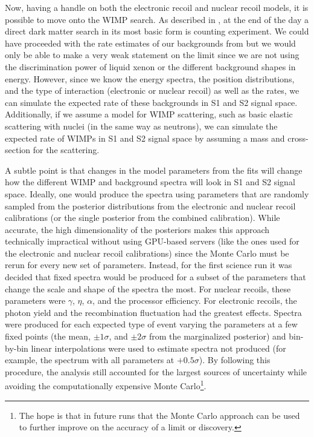 Now, having a handle on both the electronic recoil and nuclear recoil models, it is possible to move onto the WIMP search.  As described in , at the end of the day a direct dark matter search in its most basic form is counting experiment.  We could have proceeded with the rate estimates of our backgrounds from  but we would only be able to make a very weak statement on the limit since we are not using the discrimination power of liquid xenon or the different background shapes in energy.  However, since we know the energy spectra, the position distributions, and the type of interaction (electronic or nuclear recoil) as well as the rates, we can simulate the expected rate of these backgrounds in S1 and S2 signal space.  Additionally, if we assume a model for WIMP scattering, such as basic elastic scattering with nuclei (in the same way as neutrons), we can simulate the expected rate of WIMPs in S1 and S2 signal space by assuming a mass and cross-section for the scattering.  

A subtle point is that changes in the model parameters from the fits will change how the different WIMP and background spectra will look in S1 and S2 signal space.  Ideally, one would produce the spectra using parameters that are randomly sampled from the posterior distributions from the electronic and nuclear recoil calibrations (or the single posterior from the combined calibration).  While accurate, the high dimensionality of the posteriors makes this approach technically impractical without using GPU-based servers (like the ones used for the electronic and nuclear recoil calibrations) since the Monte Carlo must be rerun for every new set of parameters.  Instead, for the first science run it was decided that fixed spectra would be produced for a subset of the parameters that change the scale and shape of the spectra the most.  For nuclear recoils, these parameters were $\gamma$, $\eta$, $\alpha$, and the processor efficiency.  For electronic recoils, the photon yield and the recombination fluctuation had the greatest effects.  Spectra were produced for each expected type of event varying the parameters at a few fixed points (the mean, $\pm 1 \sigma$, and $\pm 2 \sigma$ from the marginalized posterior) and bin-by-bin linear interpolations were used to estimate spectra not produced (for example, the spectrum with all parameters at $+ 0.5 \sigma$).  By following this procedure, the analysis still accounted for the largest sources of uncertainty while avoiding the computationally expensive Monte Carlo\footnote{The hope is that in future runs that the Monte Carlo approach can be used to further improve on the accuracy of a limit or discovery.}.

